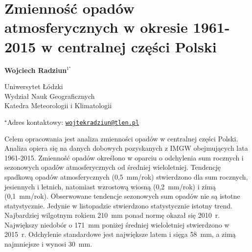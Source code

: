 \documentclass[\main/boa.tex]{subfiles}
\begin{document}
\section{Zmienność opadów atmosferycznych w okresie 1961-2015 w centralnej części Polski}

\begin{center}
  {\bf {} Wojciech Radziun$^{1^\star}$}
\end{center}

\vskip 0.3cm

\begin{affiliations}
\begin{enumerate}
\begin{minipage}{0.915\textwidth}
\centering
\item Uniwersytet Łódzki \\ Wydział Nauk Geograficznych \\ Katedra Meteorologii i Klimatologii\\[-2pt]
\end{minipage}
\end{enumerate}
$^\star$Adres kontaktowy: \href{mailto:wojtekradziun@tlen.pl}{\nolinkurl{wojtekradziun@tlen.pl}}\\
\end{affiliations}

\vskip 0.5cm


\vskip 0.5cm

Celem opracowania jest analiza zmienności opadów w centralnej części Polski. Analiza opiera            się na danych dobowych pozyskanych z IMGW obejmujących lata 1961-2015. Zmienność opadów określono w oparciu o odchylenia  sum rocznych i sezonowych opadów atmosferycznych od średniej wieloletniej. Tendencję spadkową opadów atmosferycznych (0,5~mm/rok) stwierdzono dla sum rocznych, jesiennych i letnich, natomiast wzrostową wiosną (0,2~mm/rok) i zimą (0,1~mm/rok). Obserwowane tendencje sezonowych sum opadów nie są istotne statystycznie. Jedynie w listopadzie stwierdzono statystycznie istotny trend. Najbardziej wilgotnym rokiem 210~mm ponad normę okazał się 2010~r. Największy niedobór o 171~mm poniżej średniej wieloletniej stwierdzono w 2015~r. Odchylenie standardowe jest największe latem i sięga 58~mm, a zimą najmniejsze i wynosi 30~mm.
\end{document}
